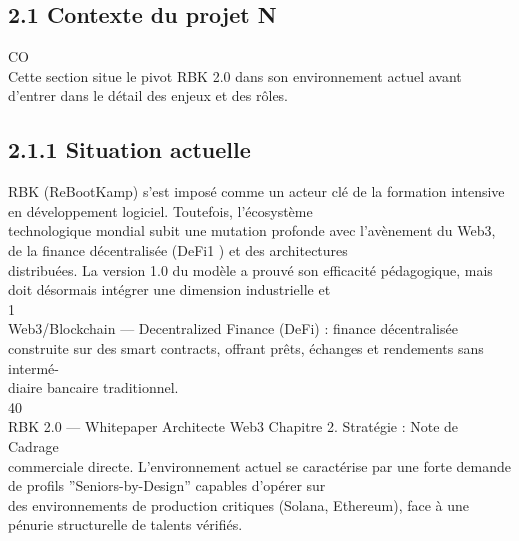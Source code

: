 \subsection{2.1 Contexte du projet                                    N}
CO\\
Cette section situe le pivot RBK 2.0 dans son environnement actuel avant d’entrer dans le détail des enjeux et des rôles.\\
\vspace{0.5em}
\vspace{0.5em}
\subsection{2.1.1 Situation actuelle}
RBK (ReBootKamp) s’est imposé comme un acteur clé de la formation intensive en développement logiciel. Toutefois, l’écosystème\\
technologique mondial subit une mutation profonde avec l’avènement du Web3, de la finance décentralisée (DeFi1 ) et des architectures\\
distribuées. La version 1.0 du modèle a prouvé son efficacité pédagogique, mais doit désormais intégrer une dimension industrielle et\\
1\\
Web3/Blockchain — Decentralized Finance (DeFi) : finance décentralisée construite sur des smart contracts, offrant prêts, échanges et rendements sans intermé-\\
diaire bancaire traditionnel.\\
\vspace{0.5em}
\vspace{0.5em}
\vspace{0.5em}
\vspace{0.5em}
40\\
RBK 2.0 — Whitepaper Architecte Web3                                                                                  Chapitre 2. Stratégie : Note de Cadrage\\
\vspace{0.5em}
\vspace{0.5em}
commerciale directe. L’environnement actuel se caractérise par une forte demande de profils ”Seniors-by-Design” capables d’opérer sur\\
des environnements de production critiques (Solana, Ethereum), face à une pénurie structurelle de talents vérifiés.\\
\vspace{0.5em}
\vspace{0.5em}
